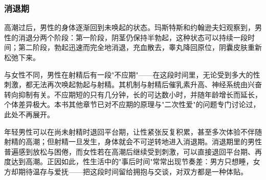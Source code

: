 \subsubsection{消退期}

高潮过后，男性的身体逐渐回到未唤起的状态。玛斯特斯和约翰逊夫妇观察到，男性的消退分两个阶段：第一阶段，阴茎仍保持半勃起，这种状态可以持续一段时间；第二阶段，勃起迅速而完全地消退，充血散去，睾丸降回原位，阴囊皮肤重新松弛下来。

与女性不同，男性在射精后有一段"不应期"——在这段时间里，无论受到多大的性刺激，都无法再次唤起勃起与射精。其机制与射精后催乳素升高、神经系统由兴奋转向抑制有关。不应期短的只有几分钟，长的可达数小时，并随年龄增长而延长，个体差异极大。本书其他章节已对不应期的原理与"二次性爱"的问题专门讨论过，此处不再展开。

年轻男性可以在尚未射精时退回平台期，让性紧张反复积累，甚至多次体验不伴随射精的高潮；但射精一旦发生，身体就会不可逆转地进入消退期。消退期里的男性普遍感到放松与困倦，而女性若在高潮后继续受到刺激，可以直接退回平台期、再度达到高潮。正因如此，性生活中的"事后时间"常常出现节奏差：男方只想睡，女方却期待温存与爱抚——把这段时间留给拥抱与交谈，对双方都是一种体贴。
